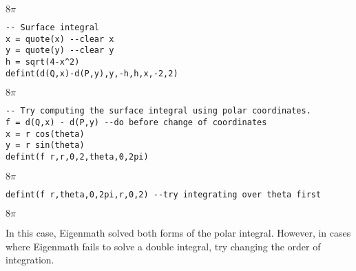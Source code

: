 \noindent
$\displaystyle 8\pi$

\begin{Verbatim}[formatcom=\color{blue},samepage=true]
-- Surface integral
x = quote(x) --clear x
y = quote(y) --clear y
h = sqrt(4-x^2)
defint(d(Q,x)-d(P,y),y,-h,h,x,-2,2)
\end{Verbatim}

\noindent
$\displaystyle 8\pi$

\begin{Verbatim}[formatcom=\color{blue},samepage=true]
-- Try computing the surface integral using polar coordinates.
f = d(Q,x) - d(P,y) --do before change of coordinates
x = r cos(theta)
y = r sin(theta)
defint(f r,r,0,2,theta,0,2pi)
\end{Verbatim}

\noindent
$\displaystyle 8\pi$

\begin{Verbatim}[formatcom=\color{blue},samepage=true]
defint(f r,theta,0,2pi,r,0,2) --try integrating over theta first
\end{Verbatim}

\noindent
$\displaystyle 8\pi$

\bigskip
\noindent
In this case, Eigenmath solved both forms of the polar integral.
However, in cases where Eigenmath fails to solve a double integral, try
changing the order of integration.
